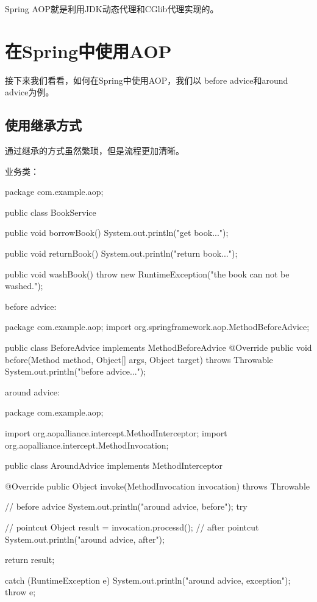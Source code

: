 \documentclass[a4paper,11pt]{article}
\begin{document}
Spring AOP就是利用JDK动态代理和CGlib代理实现的。

\section[在Spring中使用AOP]{在Spring中使用AOP}
接下来我们看看，如何在Spring中使用AOP，我们以
before advice和around advice为例。

\subsection[使用继承方式]{使用继承方式}
通过继承的方式虽然繁琐，但是流程更加清晰。

业务类：

\begin{javacode}
package com.example.aop;

public class BookService {
  public void borrowBook() {
    System.out.println("get book...");
  }

  public void returnBook() {
    System.out.println("return book...");
  }

  public void washBook() {
    throw new RuntimeException("the book can not be washed.");
  }
}
\end{javacode}

before advice:

\begin{javacode}
package com.example.aop;
import org.springframework.aop.MethodBeforeAdvice;

public class BeforeAdvice implements MethodBeforeAdvice {
  @Override
  public void before(Method method, Object[] args, Object target)
                     throws Throwable {
    System.out.println("before advice...");
  }
}
\end{javacode}

around advice:

\begin{javacode}
package com.example.aop;

import org.aopalliance.intercept.MethodInterceptor;
import org.aopalliance.intercept.MethodInvocation;

public class AroundAdvice implements MethodInterceptor {
  @Override
  public Object invoke(MethodInvocation invocation) throws Throwable {
    // before advice
    System.out.println("around advice, before");
    try {
      // pointcut
      Object result = invocation.processd();
      // after pointcut
      System.out.println("around advice, after");
      
      return result;
    } catch (RuntimeException e) {
      System.out.println("around advice, exception");
      throw e;
    }
  }
}
\end{javacode}
\end{document}
